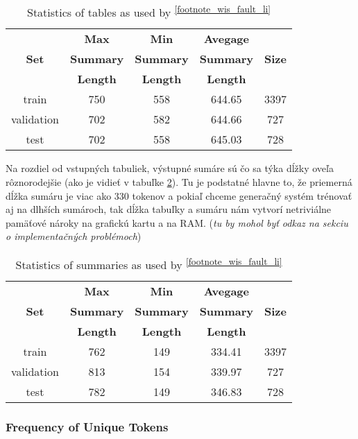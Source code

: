 \begin{table}[h!]
    \centering
    \begin{tabular}{ccccc}
        \toprule
        {}    & \textbf{Max} & \textbf{Min} & \textbf{Avegage}& {} \\
        \textbf{Set} & \textbf{Summary} & \textbf{Summary} & \textbf{Summary} & \textbf{Size} \\
        {} & \textbf{Length} & \textbf{Length} & \textbf{Length} & {} \\
        \midrule
        train      & 750 & 558 & 644.65 & 3397  \\
        validation & 702 & 582 & 644.66 & 727 \\
        test       & 702 & 558 & 645.03 & 728
    \end{tabular}
    \caption{Statistics of tables as used by \citep{wiseman2017}\textsuperscript{\ref{footnote_wis_fault_li}}} \label{stats_tables_orig_rw}
\end{table}

Na rozdiel od vstupných tabuliek, výstupné sumáre sú čo sa týka dĺžky oveľa rôznorodejšie (ako je vidieť v tabuľke \ref{stats_sums_orig_rw}). Tu je podstatné hlavne to, že priemerná dĺžka sumáru je viac ako 330 tokenov a pokiaľ chceme generačný systém trénovať aj na dlhších sumároch, tak dĺžka tabuľky a sumáru nám vytvorí netriviálne pamäťové nároky na grafickú kartu a na RAM. (\emph{tu by mohol byť odkaz na sekciu o implementačných problémoch})

\begin{table}[h!]
    \centering
    \begin{tabular}{ccccc}
        \toprule
        {}    & \textbf{Max} & \textbf{Min} & \textbf{Avegage}& {} \\
        \textbf{Set} & \textbf{Summary} & \textbf{Summary} & \textbf{Summary} & \textbf{Size} \\
        {} & \textbf{Length} & \textbf{Length} & \textbf{Length} & {} \\
        \midrule
        train      & 762 & 149 & 334.41 & 3397  \\
        validation & 813 & 154 & 339.97 & 727 \\
        test       & 782 & 149 & 346.83 & 728
    \end{tabular}
    \caption{Statistics of summaries as used by \citep{wiseman2017}\textsuperscript{\ref{footnote_wis_fault_li}}} \label{stats_sums_orig_rw}
\end{table}


\subsubsection{Frequency of Unique Tokens}


